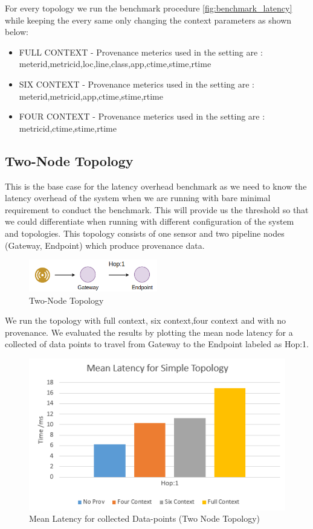For every topology we run the benchmark procedure \ref{fig:benchmark_latency} while keeping the every same only changing the context parameters as shown below:

\begin{itemize}
	\item FULL CONTEXT - Provenance meterics used in the setting are :
	meterid,metricid,loc,line,class,app,ctime,stime,rtime
	\item SIX CONTEXT - Provenance meterics used in the setting are :
	meterid,metricid,app,ctime,stime,rtime
	\item FOUR CONTEXT - Provenance meterics used in the setting are :
	metricid,ctime,stime,rtime
\end{itemize}


\subsection{Two-Node Topology}
This is the base case for the latency overhead benchmark as we need to know the latency overhead of the system when we are running with bare minimal requirement to conduct the benchmark. This will provide us the threshold so that we could differentiate when running with different configuration of the system and topologies. This topology consists of one sensor and two pipeline nodes (Gateway, Endpoint) which produce provenance data. 

\begin{figure}[H]
	\center
	\includegraphics[width=0.5\textwidth]{figures/latencytopo_two.png}
	\caption{Two-Node Topology}
	\label{fig:two_topo}
\end{figure}

We run the topology with full context, six context,four context and with no provenance. We evaluated the results by plotting the mean node latency for a collected of data points
to travel from Gateway to the Endpoint labeled as Hop:1.

\begin{figure}[H]
	\center
	\includegraphics[width=\textwidth]{figures/simpletopology_latency.png}
	\caption{Mean Latency for collected Data-points (Two Node Topology)}
	\label{fig:twotopology_latency}
\end{figure}

